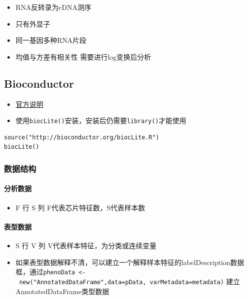 \documentclass[
]{book}
\providecommand{\tightlist}{%
  \setlength{\itemsep}{0pt}\setlength{\parskip}{0pt}}
\begin{document}
\begin{itemize}
\tightlist
\item
  RNA反转录为cDNA测序
\item
  只有外显子
\item
  同一基因多种RNA片段
\item
  均值与方差有相关性 需要进行log变换后分析
\end{itemize}

\hypertarget{bioconductor}{%
\subsection{Bioconductor}\label{bioconductor}}

\begin{itemize}
\tightlist
\item
  \href{http://bioconductor.org/install/}{官方说明}
\item
  使用\texttt{biocLite()}安装，安装后仍需要\texttt{library()}才能使用
\end{itemize}

\begin{verbatim}
source("http://bioconductor.org/biocLite.R")
biocLite()
\end{verbatim}

\hypertarget{ux6570ux636eux7ed3ux6784-1}{%
\subsubsection{数据结构}\label{ux6570ux636eux7ed3ux6784-1}}

\hypertarget{ux5206ux6790ux6570ux636e}{%
\paragraph{分析数据}\label{ux5206ux6790ux6570ux636e}}

\begin{itemize}
\tightlist
\item
  F 行 S 列 F代表芯片特征数，S代表样本数
\end{itemize}

\hypertarget{ux8868ux578bux6570ux636e}{%
\paragraph{表型数据}\label{ux8868ux578bux6570ux636e}}

\begin{itemize}
\tightlist
\item
  S 行 V 列 V代表样本特征，为分类或连续变量
\item
  如果表型数据解释不清，可以建立一个解释样本特征的labelDescription数据框，通过\texttt{phenoData\ \textless{}-\ new("AnnotatedDataFrame",data=pData,\ varMetadata=metadata)} 建立AnnotatedDataFrame类型数据
\end{itemize}
\end{document}
